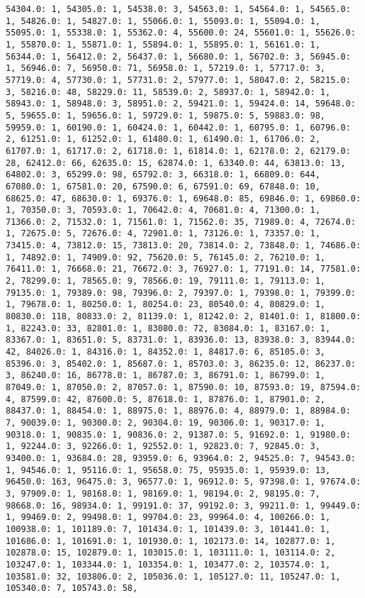 \documentclass[11pt]{article}
\begin{document}
\begin{Verbatim}[commandchars=\\\{\}]
54304.0: 1, 54305.0: 1, 54538.0: 3, 54563.0: 1, 54564.0: 1, 54565.0: 1, 54826.0: 1, 54827.0: 1, 55066.0: 1, 55093.0: 1, 55094.0: 1, 55095.0: 1, 55338.0: 1, 55362.0: 4, 55600.0: 24, 55601.0: 1, 55626.0: 1, 55870.0: 1, 55871.0: 1, 55894.0: 1, 55895.0: 1, 56161.0: 1, 56344.0: 1, 56412.0: 2, 56437.0: 1, 56680.0: 1, 56702.0: 3, 56945.0: 1, 56946.0: 7, 56950.0: 71, 56958.0: 1, 57219.0: 1, 57717.0: 3, 57719.0: 4, 57730.0: 1, 57731.0: 2, 57977.0: 1, 58047.0: 2, 58215.0: 3, 58216.0: 48, 58229.0: 11, 58539.0: 2, 58937.0: 1, 58942.0: 1, 58943.0: 1, 58948.0: 3, 58951.0: 2, 59421.0: 1, 59424.0: 14, 59648.0: 5, 59655.0: 1, 59656.0: 1, 59729.0: 1, 59875.0: 5, 59883.0: 98, 59959.0: 1, 60190.0: 1, 60424.0: 1, 60442.0: 1, 60795.0: 1, 60796.0: 2, 61251.0: 1, 61252.0: 1, 61480.0: 1, 61490.0: 1, 61706.0: 2, 61707.0: 1, 61717.0: 2, 61718.0: 1, 61814.0: 1, 62178.0: 2, 62179.0: 28, 62412.0: 66, 62635.0: 15, 62874.0: 1, 63340.0: 44, 63813.0: 13, 64802.0: 3, 65299.0: 98, 65792.0: 3, 66318.0: 1, 66809.0: 644, 67080.0: 1, 67581.0: 20, 67590.0: 6, 67591.0: 69, 67848.0: 10, 68625.0: 47, 68630.0: 1, 69376.0: 1, 69648.0: 85, 69846.0: 1, 69860.0: 1, 70350.0: 3, 70593.0: 1, 70642.0: 4, 70681.0: 4, 71300.0: 1, 71366.0: 2, 71532.0: 1, 71561.0: 1, 71562.0: 35, 71989.0: 4, 72674.0: 1, 72675.0: 5, 72676.0: 4, 72901.0: 1, 73126.0: 1, 73357.0: 1, 73415.0: 4, 73812.0: 15, 73813.0: 20, 73814.0: 2, 73848.0: 1, 74686.0: 1, 74892.0: 1, 74909.0: 92, 75620.0: 5, 76145.0: 2, 76210.0: 1, 76411.0: 1, 76668.0: 21, 76672.0: 3, 76927.0: 1, 77191.0: 14, 77581.0: 2, 78299.0: 1, 78565.0: 9, 78566.0: 19, 79111.0: 1, 79113.0: 1, 79135.0: 1, 79389.0: 98, 79396.0: 2, 79397.0: 1, 79398.0: 1, 79399.0: 1, 79678.0: 1, 80250.0: 1, 80254.0: 23, 80540.0: 4, 80829.0: 1, 80830.0: 118, 80833.0: 2, 81139.0: 1, 81242.0: 2, 81401.0: 1, 81800.0: 1, 82243.0: 33, 82801.0: 1, 83080.0: 72, 83084.0: 1, 83167.0: 1, 83367.0: 1, 83651.0: 5, 83731.0: 1, 83936.0: 13, 83938.0: 3, 83944.0: 42, 84026.0: 1, 84316.0: 1, 84352.0: 1, 84817.0: 6, 85105.0: 3, 85396.0: 3, 85402.0: 1, 85687.0: 1, 85703.0: 3, 86235.0: 12, 86237.0: 3, 86240.0: 16, 86778.0: 1, 86787.0: 3, 86791.0: 1, 86799.0: 1, 87049.0: 1, 87050.0: 2, 87057.0: 1, 87590.0: 10, 87593.0: 19, 87594.0: 4, 87599.0: 42, 87600.0: 5, 87618.0: 1, 87876.0: 1, 87901.0: 2, 88437.0: 1, 88454.0: 1, 88975.0: 1, 88976.0: 4, 88979.0: 1, 88984.0: 7, 90039.0: 1, 90300.0: 2, 90304.0: 19, 90306.0: 1, 90317.0: 1, 90318.0: 1, 90835.0: 1, 90836.0: 2, 91387.0: 5, 91692.0: 1, 91980.0: 1, 92244.0: 3, 92266.0: 1, 92552.0: 1, 92823.0: 7, 92845.0: 3, 93400.0: 1, 93684.0: 28, 93959.0: 6, 93964.0: 2, 94525.0: 7, 94543.0: 1, 94546.0: 1, 95116.0: 1, 95658.0: 75, 95935.0: 1, 95939.0: 13, 96450.0: 163, 96475.0: 3, 96577.0: 1, 96912.0: 5, 97398.0: 1, 97674.0: 3, 97909.0: 1, 98168.0: 1, 98169.0: 1, 98194.0: 2, 98195.0: 7, 98668.0: 16, 98934.0: 1, 99191.0: 37, 99192.0: 3, 99211.0: 1, 99449.0: 1, 99469.0: 2, 99498.0: 1, 99704.0: 23, 99964.0: 4, 100266.0: 1, 100938.0: 1, 101189.0: 7, 101434.0: 1, 101439.0: 3, 101441.0: 1, 101686.0: 1, 101691.0: 1, 101930.0: 1, 102173.0: 14, 102877.0: 1, 102878.0: 15, 102879.0: 1, 103015.0: 1, 103111.0: 1, 103114.0: 2, 103247.0: 1, 103344.0: 1, 103354.0: 1, 103477.0: 2, 103574.0: 1, 103581.0: 32, 103806.0: 2, 105036.0: 1, 105127.0: 11, 105247.0: 1, 105340.0: 7, 105743.0: 58, 
\end{Verbatim}
\end{document}
